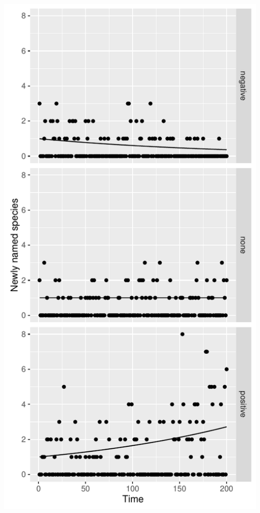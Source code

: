 \documentclass{beamer}
\begin{document}
\begin{frame}
\begin{columns}
\begin{column}{0.5\textwidth}
\begin{center}
        \includegraphics[width=\textwidth,height=0.8\textheight,keepaspectratio=true]{figure/prior_pred}
      \end{center}
    \end{column}
  \end{columns}
\end{frame}
\end{document}
